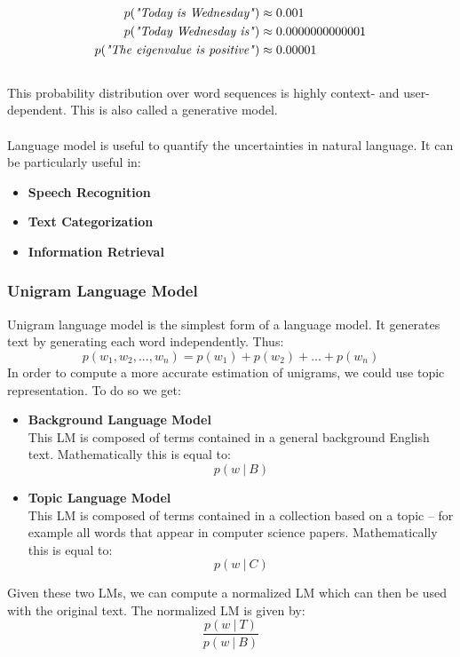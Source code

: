 \documentclass{article}
\begin{document}
\begin{align*}
	p(\text{\textit{"Today is Wednesday"}}) & \approx 0.001 \\
	p(\text{\textit{"Today Wednesday is"}}) & \approx 0.0000000000001 \\
	p(\text{\textit{"The eigenvalue is positive"}}) & \approx 0.00001
\end{align*} \\
This probability distribution over word sequences is highly context- and user-dependent. This is also called a generative model. \\ \\
Language model is useful to quantify the uncertainties in natural language. It can be particularly useful in:

\begin{itemize}
	\item \textbf{Speech Recognition}
	\item \textbf{Text Categorization}
	\item \textbf{Information Retrieval}
\end{itemize}

\subsubsection{Unigram Language Model}
Unigram language model is the simplest form of a language model. It generates text by generating each word independently. Thus:
\[ p(w_1, w_2, ..., w_n) = p(w_1) + p(w_2) + ... + p(w_n) \]
In order to compute a more accurate estimation of unigrams, we could use topic representation. To do so we get:

\begin{itemize}
	\item \textbf{Background Language Model}
	\vspace{.2cm} \\
	This LM is composed of terms contained in a general background English text. Mathematically this is equal to:
	\[ p(w~|~B) \]
	
	\item \textbf{Topic Language Model}
	\vspace{.2cm} \\
	This LM is composed of terms contained in a collection based on a topic -- for example all words that appear in computer science papers. Mathematically this is equal to:
	\[ p(w~|~C) \]
\end{itemize}
Given these two LMs, we can compute a normalized LM which can then be used with the original text. The normalized LM is given by:
\[ \frac{p(w~|~T)}{p(w~|~B)} \]
\end{document}
